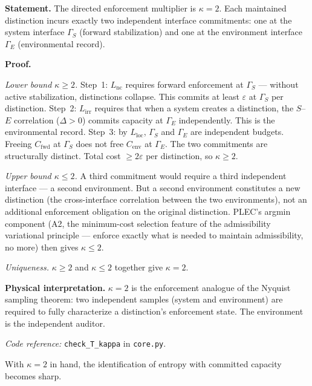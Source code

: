 \documentclass[11pt]{article}
\newcommand{\coderef}[2]{\smallskip\noindent\textit{Code reference:} \texttt{#1} in \texttt{#2}.}
\newcommand{\epitag}[1]{\textbf{[#1]}}
\begin{document}
\begin{tcolorbox}[apfbox, title={Theorem $T_{\kappa}$ (Directed Enforcement Multiplier) \epitag{P}}]
\textbf{Statement.}
The directed enforcement multiplier is $\kappa = 2$.  Each maintained
distinction incurs exactly two independent interface commitments: one at the
system interface $\Gamma_S$ (forward stabilization) and one at the
environment interface $\Gamma_E$ (environmental record).

\textbf{Proof.}

\smallskip\noindent\emph{Lower bound $\kappa \geq 2$.}
Step~1: $L_{\mathrm{nc}}$ requires forward enforcement at $\Gamma_S$ ---
without active stabilization, distinctions collapse.  This commits at least
$\varepsilon$ at $\Gamma_S$ per distinction.  Step~2: $L_{\mathrm{irr}}$
requires that when a system creates a distinction, the $S$--$E$ correlation
($\Delta > 0$) commits capacity at $\Gamma_E$ independently.  This is the
environmental record.  Step~3: by $L_{\mathrm{loc}}$, $\Gamma_S$ and
$\Gamma_E$ are independent budgets.  Freeing $C_{\mathrm{fwd}}$ at $\Gamma_S$
does not free $C_{\mathrm{env}}$ at $\Gamma_E$.  The two commitments are
structurally distinct.  Total cost $\geq 2\varepsilon$ per distinction, so
$\kappa \geq 2$.

\smallskip\noindent\emph{Upper bound $\kappa \leq 2$.}
A third commitment would require a third independent interface --- a second
environment.  But a second environment constitutes a new distinction (the
cross-interface correlation between the two environments), not an additional
enforcement obligation on the original distinction.  PLEC's argmin
component (A2, the minimum-cost selection feature of the admissibility
variational principle --- enforce exactly what is needed to maintain
admissibility, no more) then gives $\kappa \leq 2$.

\smallskip\noindent\emph{Uniqueness.}  $\kappa \geq 2$ and $\kappa \leq 2$
together give $\kappa = 2$.

\textbf{Physical interpretation.}  $\kappa = 2$ is the enforcement analogue
of the Nyquist sampling theorem: two independent samples (system and
environment) are required to fully characterize a distinction's enforcement
state.  The environment is the independent auditor.

\coderef{check\_T\_kappa}{core.py}
\end{tcolorbox}

With $\kappa = 2$ in hand, the identification of entropy with committed
capacity becomes sharp.
\end{document}

